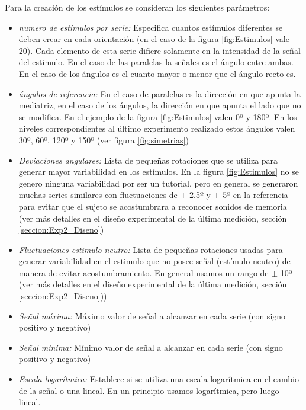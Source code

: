 \documentclass{article}
\begin{document}
    
    Para la creación de los estímulos se consideran los siguientes parámetros: 
    \begin{itemize}
        \item \textit{numero de estímulos por serie:} Especifica cuantos estímulos diferentes se deben crear en cada orientación (en el caso de la figura \ref{fig:Estimulos} vale 20). Cada elemento de esta serie difiere solamente en la intensidad de la señal del estimulo. En el caso de las paralelas la señales es el ángulo entre ambas. En el caso de los ángulos es el cuanto mayor o menor que el ángulo recto es.
        \item \textit{ángulos de referencia:} En el caso de paralelas es la dirección en que apunta la mediatriz, en el caso de los ángulos, la dirección en que apunta el lado que no se modifica. En el ejemplo de la figura \ref{fig:Estimulos} valen 0º y 180º. En los niveles correspondientes al último experimento realizado estos ángulos valen 30º, 60º, 120º y 150º (ver figura \ref{fig:simetrias}) 
        \item \textit{Deviaciones angulares:} Lista de pequeñas rotaciones que se utiliza para generar mayor variabilidad en los estímulos. En la figura \ref{fig:Estimulos} no se genero ninguna variabilidad por ser un tutorial, pero en general se generaron muchas series similares con fluctuaciones de $\pm$ 2.5º y $\pm$ 5º en la referencia para evitar que el sujeto se acostumbrara a reconocer sonidos de memoria (ver más detalles en el diseño experimental de la última medición, sección \ref{seccion:Exp2_Diseno})
        \item \textit{Fluctuaciones estimulo neutro:} Lista de pequeñas rotaciones usadas para generar variabilidad en el estimulo que no posee señal (estímulo neutro) de manera de evitar acostumbramiento. En general usamos un rango de $\pm$ 10º  (ver más detalles en el diseño experimental de la última medición, sección \ref{seccion:Exp2_Diseno}))
        \item \textit{Señal máxima:} Máximo valor de señal a alcanzar en cada serie (con signo positivo y negativo)
        \item \textit{Señal mínima:} Mínimo valor de señal a alcanzar en cada serie (con signo positivo y negativo)
        \item \textit{Escala logarítmica:} Establece si se utiliza una escala logarítmica en el cambio de la señal o una lineal. En un principio usamos logarítmica, pero luego lineal. 
    \end{itemize}
    
\end{document}
